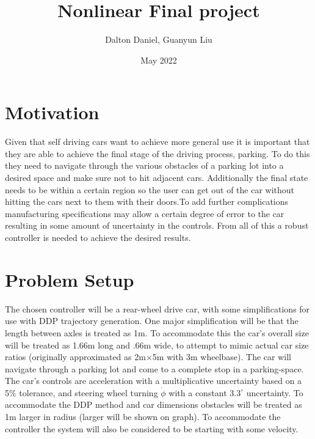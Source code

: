 \documentclass[letterpaper, 12pt]{article}
\title{Nonlinear Final project}
\author{Dalton Daniel, Guanyun Liu}
\date{May 2022}
\begin{document}
\maketitle
\section{Motivation}
Given that self driving cars want to achieve more general use it is important that they are able to achieve the final stage of the driving process, parking. To do this they need to navigate through the various obstacles of a parking lot into a desired space and make sure not to hit adjacent cars. Additionally the final state needs to be within a certain region so the user can get out of the car without hitting the cars next to them with their doors.To add further complications manufacturing specifications may allow a certain degree of error to the car resulting in some amount of uncertainty in the controls. From all of this a robust controller is needed to achieve the desired results.
\section{Problem Setup}
The chosen controller will be a rear-wheel drive car, with some simplifications for use with DDP trajectory generation. One major simplification will be that the length between axles is treated as 1m. To accommodate this the car's overall size will be treated as 1.66m long and .66m wide, to attempt to mimic actual car size ratios (originally approximated as 2m$\times$5m with 3m wheelbase). The car will navigate through a parking lot and come to a complete stop in a parking-space. The car's controls are acceleration with a multiplicative uncertainty based on a 5\% tolerance, and steering wheel turning $\dot{\phi}$ with a constant $3.3^\circ$ uncertainty. To accommodate the DDP method and car dimensions obstacles will be treated as 1m larger in radius (larger will be shown on graph). To accommodate the controller the system will also be considered to be starting with some velocity.
\end{document}

